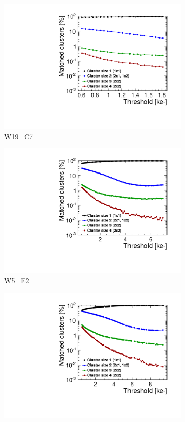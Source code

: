\begin{figure}[htbp]
  \begin{subfigure}[b]{0.33\textwidth}
    \includegraphics[width=\textwidth]{./figures/TestBeam/cluSize_THLscan_W0019_C07.pdf}
    \caption{W19\_C7}
  \end{subfigure} \hfill
  \begin{subfigure}[b]{0.33\textwidth}
    \includegraphics[width=\textwidth]{./figures/TestBeam/cluSize_THLscan_W0005_E02.pdf}
    \caption{W5\_E2}
  \end{subfigure}\hfill
  \begin{subfigure}[b]{0.33\textwidth}
    \includegraphics[width=\textwidth]{./figures/TestBeam/cluSize_THLscan_W0005_F01.pdf}

\end{subfigure}
\end{figure}
